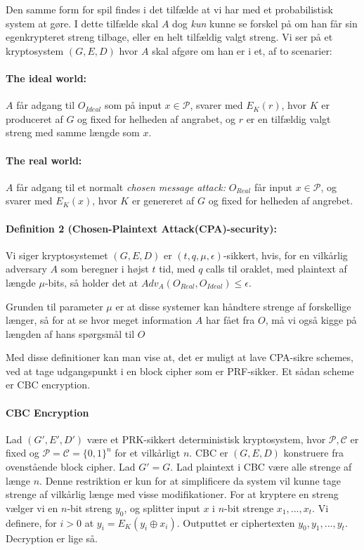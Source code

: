 \documentclass[paper=a4, fontsize=11pt]{scrartcl} %
\numberwithin{equation}{section} %
\numberwithin{figure}{section} %
\numberwithin{table}{section} %
\begin{document}
	Den samme form for spil findes i det tilfælde at vi har med et probabilistisk system at gøre. I dette tilfælde skal $A$ dog \textit{kun} kunne se forskel på om han får sin egenkrypteret streng tilbage, eller en helt tilfældig valgt streng. Vi ser på et kryptosystem $(G,E,D)$ hvor $A$ skal afgøre om han er i et, af to scenarier:
	
	\paragraph{\textbf{The ideal world:}} $A$ får adgang til $O_{Ideal}$ som på input $x\in\mathcal{P}$, svarer med $E_K(r)$, hvor $K$ er produceret af $G$ og fixed for helheden af angrabet, og $r$ er en tilfældig valgt streng med samme længde som $x$.
	\paragraph{\textbf{The real world:}} $A$ får adgang til et normalt \textit{chosen message attack:} $O_{Real}$ får input $x\in\mathcal{P}$, og svarer med $E_K(x)$, hvor $K$ er genereret af $G$ og fixed for helheden af angrebet.
	\paragraph{\textbf{Definition 2 (Chosen-Plaintext Attack(CPA)-security):}} Vi siger kryptosystemet $(G,E,D)$ er $(t,q,\mu,\epsilon)$-sikkert, hvis, for en vilkårlig adversary $A$ som beregner i højst $t$ tid, med $q$ calls til oraklet, med plaintext af længde $\mu$-bits, så holder det at $Adv_A(O_{Real},O_{Ideal})\leq\epsilon$.
	
	Grunden til parameter $\mu$ er at disse systemer kan håndtere strenge af forskellige længer, så for at se hvor meget information $A$ har fået fra $O$, må vi også kigge på længden af hans spørgsmål til $O$
	
	Med disse definitioner kan man vise at, det er muligt at lave CPA-sikre schemes, ved at tage udgangspunkt i en block cipher som er PRF-sikker. Et sådan scheme er CBC encryption.
	
	\begin{mdframed}
		\paragraph{\textbf{CBC Encryption}} Lad $(G',E',D')$ være et PRK-sikkert deterministisk kryptosystem, hvor $\mathcal{P},\mathcal{C}$ er fixed og $\mathcal{P}=\mathcal{C}=\{0,1\}^n$ for et vilkårligt $n$. CBC er $(G,E,D)$ konstruere fra ovenstående block cipher. Lad $G'=G$. Lad plaintext i CBC være alle strenge af længe $n$. Denne restriktion er kun for at simplificere da system vil kunne tage strenge af vilkårlig længe med visse modifikationer. For at kryptere en streng vælger vi en $n$-bit streng $y_0$, og splitter input $x$ i $n$-bit strenge $x_1,...,x_t$. Vi definere, for $i>0$ at $y_i=E_K(y_i\oplus x_i)$. Outputtet er ciphertexten $y_0,y_1,...,y_t$. Decryption er lige så.
	\end{mdframed}
	
\end{document}
